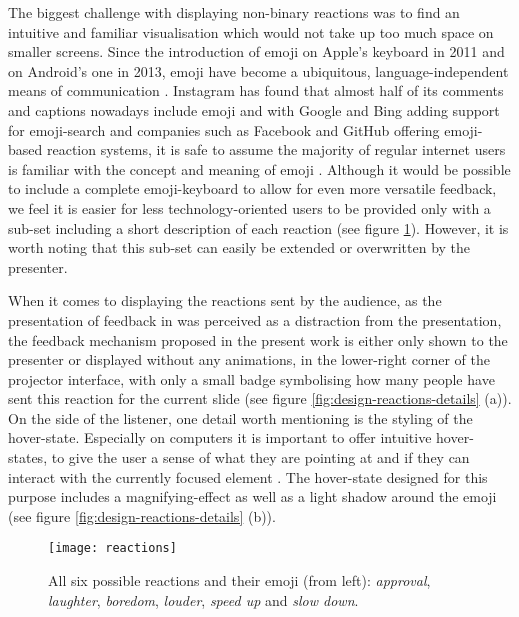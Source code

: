 The biggest challenge with displaying non-binary reactions was to find an intuitive and familiar visualisation which would not take up too much space on smaller screens. Since the introduction of emoji on Apple's keyboard in 2011 and on Android's one in 2013, emoji have become a ubiquitous, language-independent means of communication \cite{Instagramm:Emoji, Cappallo:ImageToEmoji}. Instagram has found that almost half of its comments and captions nowadays include emoji \cite{Instagramm:Emoji} and with Google \cite{Google:Emoji} and Bing \cite{Bing:Emoji} adding support for emoji-search and companies such as Facebook \cite{Facebook:Reactions} and GitHub \cite{Github:Reactions} offering emoji-based reaction systems, it is safe to assume the majority of regular internet users is familiar with the concept and meaning of emoji \cite{Cappallo:EmojiVideoSearch}. Although it would be possible to include a complete emoji-keyboard to allow for even more versatile feedback, we feel it is easier for less technology-oriented users to be provided only with a sub-set including a short description of each reaction (see figure \ref{fig:design-reactions}). However, it is worth noting that this sub-set can easily be extended or overwritten by the presenter.

When it comes to displaying the reactions sent by the audience, as the presentation of feedback in \cite{Teevan:MobileFeedbackDuringPresentation} was perceived as a distraction from the presentation, the feedback mechanism proposed in the present work is either only shown to the presenter or displayed without any animations, in the lower-right corner of the projector interface, with only a small badge symbolising how many people have sent this reaction for the current slide (see figure \ref{fig:design-reactions-details} (a)). On the side of the listener, one detail worth mentioning is the styling of the hover-state. Especially on computers it is important to offer intuitive hover-states, to give the user a sense of what they are pointing at and if they can interact with the currently focused element \cite{hover}. The hover-state designed for this purpose includes a magnifying-effect as well as a light shadow around the emoji (see figure \ref{fig:design-reactions-details} (b)).

\begin{figure}
\centering
\texttt{[image: reactions]}
\caption{All six possible reactions and their emoji (from left): \emph{approval}, \emph{laughter}, \emph{boredom}, \emph{louder}, \emph{speed up} and \emph{slow down}.}
\label{fig:design-reactions}
\end{figure}

